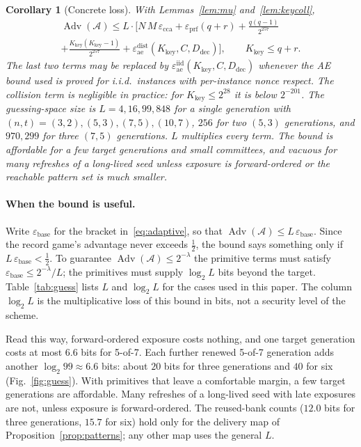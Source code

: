 \documentclass[pdflatex,sn-mathphys-num]{sn-jnl}%
\theoremstyle{plain}
\newtheorem{corollary}[theorem]{Corollary}
\theoremstyle{definition}
\newcommand{\Adv}{\operatorname{Adv}}
\begin{document}
\begin{corollary}[Concrete loss]\label{cor:loss}
With Lemmas~\ref{lem:mu} and~\ref{lem:keycoll},
\begin{multline*}
 \Adv(\mathcal A)\le L\cdot\Big[N\,M\,\varepsilon_{\mathrm{cca}}+\varepsilon_{\mathrm{prf}}(q+r)+\frac{q(q-1)}{2^{257}}\\
 +\frac{K_{\mathrm{key}}(K_{\mathrm{key}}-1)}{2^{257}}+\varepsilon^{\mathrm{dist}}_{\mathrm{ae}}(K_{\mathrm{key}},C,D_{\mathrm{dec}})\Big],\qquad K_{\mathrm{key}}\le q+r.
\end{multline*}
The last two terms may be replaced by $\varepsilon^{\mathrm{iid}}_{\mathrm{ae}}(K_{\mathrm{key}},C,D_{\mathrm{dec}})$ whenever the AE bound used is proved for i.i.d.\ instances with per-instance nonce respect. The collision term is negligible in practice: for $K_{\mathrm{key}}\le2^{28}$ it is below $2^{-201}$.
The guessing-space size is $L=4,16,99,848$ for a single generation with $(n,t)=(3,2),(5,3),(7,5),(10,7)$, $256$ for two $(5,3)$ generations, and $970{,}299$ for three $(7,5)$ generations. $L$ multiplies every term. The bound is affordable for a few target generations and small committees, and vacuous for many refreshes of a long-lived seed unless exposure is forward-ordered or the reachable pattern set is much smaller.
\end{corollary}

\paragraph{When the bound is useful.}
Write $\varepsilon_{\mathrm{base}}$ for the bracket in~\eqref{eq:adaptive}, so that $\Adv(\mathcal A)\le L\,\varepsilon_{\mathrm{base}}$. Since the record game's advantage never exceeds $\tfrac12$, the bound says something only if $L\,\varepsilon_{\mathrm{base}}<\tfrac12$. To guarantee $\Adv(\mathcal A)\le2^{-\lambda}$ the primitive terms must satisfy $\varepsilon_{\mathrm{base}}\le2^{-\lambda}/L$; the primitives must supply $\log_2L$ bits beyond the target. Table~\ref{tab:guess} lists $L$ and $\log_2L$ for the cases used in this paper. The column $\log_2L$ is the multiplicative loss of this bound in bits, not a security level of the scheme.

Read this way, forward-ordered exposure costs nothing, and one target generation costs at most $6.6$ bits for 5-of-7. Each further renewed 5-of-7 generation adds another $\log_2 99\approx6.6$ bits: about $20$ bits for three generations and $40$ for six (Fig.~\ref{fig:guess}). With primitives that leave a comfortable margin, a few target generations are affordable. Many refreshes of a long-lived seed with late exposures are not, unless exposure is forward-ordered. The reused-bank counts ($12.0$ bits for three generations, $15.7$ for six) hold only for the delivery map of Proposition~\ref{prop:patterns}; any other map uses the general $L$.
\end{document}
